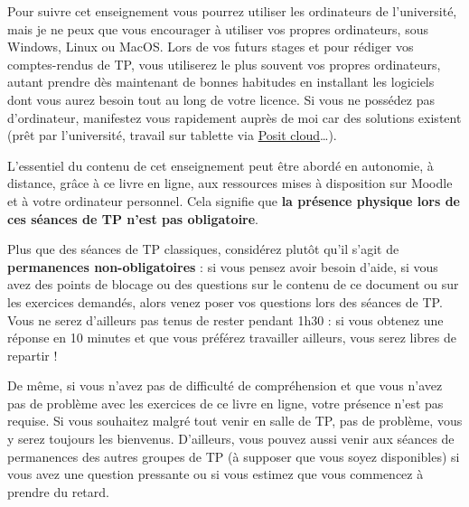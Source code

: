 \documentclass[
  a4paper,
  DIV=11,
  numbers=noendperiod,
  oneside]{scrreprt}
\begin{document}
Pour suivre cet enseignement vous pourrez utiliser les ordinateurs de
l'université, mais je ne peux que vous encourager à utiliser vos propres
ordinateurs, sous Windows, Linux ou MacOS. Lors de vos futurs stages et
pour rédiger vos comptes-rendus de TP, vous utiliserez le plus souvent
vos propres ordinateurs, autant prendre dès maintenant de bonnes
habitudes en installant les logiciels dont vous aurez besoin tout au
long de votre licence. Si vous ne possédez pas d'ordinateur, manifestez
vous rapidement auprès de moi car des solutions existent (prêt par
l'université, travail sur tablette via \href{https://posit.cloud}{Posit
cloud}\ldots).

\begin{tcolorbox}[enhanced jigsaw, colbacktitle=quarto-callout-important-color!10!white, left=2mm, leftrule=.75mm, titlerule=0mm, bottomtitle=1mm, colback=white, breakable, arc=.35mm, bottomrule=.15mm, toprule=.15mm, toptitle=1mm, opacitybacktitle=0.6, title=\textcolor{quarto-callout-important-color}{\faExclamation}\hspace{0.5em}{Important}, coltitle=black, rightrule=.15mm, opacityback=0, colframe=quarto-callout-important-color-frame]

L'essentiel du contenu de cet enseignement peut être abordé en
autonomie, à distance, grâce à ce livre en ligne, aux ressources mises à
disposition sur Moodle et à votre ordinateur personnel. Cela signifie
que \textbf{la présence physique lors de ces séances de TP n'est pas
obligatoire}.

\end{tcolorbox}

Plus que des séances de TP classiques, considérez plutôt qu'il s'agit de
\textbf{permanences non-obligatoires} : si vous pensez avoir besoin
d'aide, si vous avez des points de blocage ou des questions sur le
contenu de ce document ou sur les exercices demandés, alors venez poser
vos questions lors des séances de TP. Vous ne serez d'ailleurs pas tenus
de rester pendant 1h30 : si vous obtenez une réponse en 10 minutes et
que vous préférez travailler ailleurs, vous serez libres de repartir !

De même, si vous n'avez pas de difficulté de compréhension et que vous
n'avez pas de problème avec les exercices de ce livre en ligne, votre
présence n'est pas requise. Si vous souhaitez malgré tout venir en salle
de TP, pas de problème, vous y serez toujours les bienvenus. D'ailleurs,
vous pouvez aussi venir aux séances de permanences des autres groupes de
TP (à supposer que vous soyez disponibles) si vous avez une question
pressante ou si vous estimez que vous commencez à prendre du retard.
\end{document}
